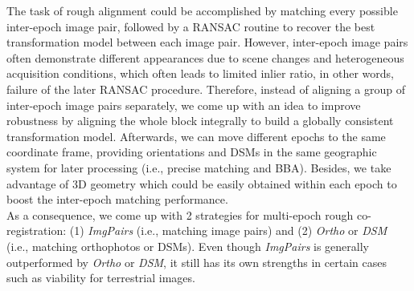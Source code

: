 The task of rough alignment could be accomplished by matching every possible inter-epoch image pair, followed by a RANSAC routine to recover the best transformation model between each image pair.
However, inter-epoch image pairs often demonstrate different appearances due to scene changes and heterogeneous acquisition conditions, which often leads to limited inlier ratio, in other words, failure of the later RANSAC procedure. Therefore, instead of aligning a group of inter-epoch image pairs separately, we come up with an idea to improve robustness by aligning the whole block integrally to build a globally consistent transformation model. Afterwards, we can move different epochs to the same coordinate frame, providing orientations and \ac{DSM}s in the same geographic system for later processing (i.e., precise matching and \ac{BBA}). Besides, we take advantage of 3D geometry which could be easily obtained within each epoch to boost the inter-epoch matching performance.\\
As a consequence, we come up with 2 strategies for multi-epoch rough co-registration: (1) \textit{ImgPairs} (i.e., matching image pairs) and (2) \textit{Ortho} or \textit{DSM} (i.e., matching orthophotos or \ac{DSM}s).  Even though \textit{ImgPairs} is generally outperformed by \textit{Ortho} or \textit{DSM}, it still has its own strengths in certain cases such as viability for terrestrial images.\\

